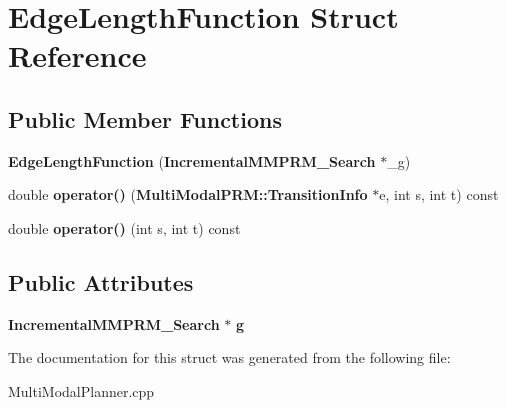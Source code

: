 \section{Edge\+Length\+Function Struct Reference}
\label{structEdgeLengthFunction}
\subsection*{Public Member Functions}
\begin{DoxyCompactItemize}
\item 
{\bfseries Edge\+Length\+Function} ({\bf Incremental\+M\+M\+P\+R\+M\+\_\+\+Search} $\ast$\+\_\+g)\label{structEdgeLengthFunction_a11ab35ff5ac4b02a358cfb52f245246d}

\item 
double {\bfseries operator()} ({\bf Multi\+Modal\+P\+R\+M\+::\+Transition\+Info} $\ast$e, int s, int t) const \label{structEdgeLengthFunction_ad08896952a7ba77083b886ff40bcb748}

\item 
double {\bfseries operator()} (int s, int t) const \label{structEdgeLengthFunction_a99c55c6fa7407db47749fe462b2738d8}

\end{DoxyCompactItemize}
\subsection*{Public Attributes}
\begin{DoxyCompactItemize}
\item 
{\bf Incremental\+M\+M\+P\+R\+M\+\_\+\+Search} $\ast$ {\bfseries g}\label{structEdgeLengthFunction_a4bcb8c3f8cfedde62109d64dce67d539}

\end{DoxyCompactItemize}


The documentation for this struct was generated from the following file\+:\begin{DoxyCompactItemize}
\item 
Multi\+Modal\+Planner.\+cpp\end{DoxyCompactItemize}
